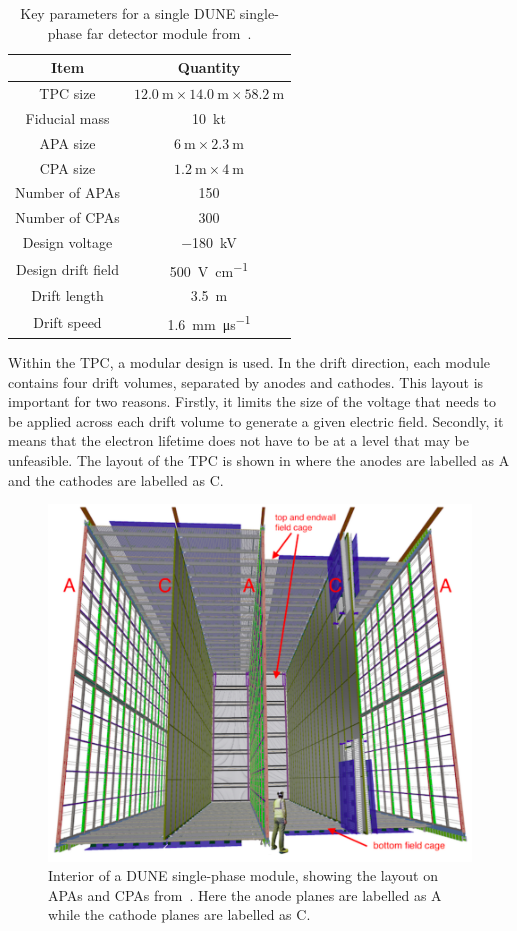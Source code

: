 \begin{table}
  \caption[Key parameters for a single DUNE single-phase far detector module.]{Key parameters for a single DUNE single-phase far detector module from~\cite{tdrVol4}.}
  \label{tab:spStats}
  \centering
  \begin{tabular}{c c}
    \hline
    \hline
    Item & Quantity \\
    \hline
    TPC size & $\SI{12.0}{\metre} \times \SI{14.0}{\metre} \times \SI{58.2}{\metre}$ \\
    Fiducial mass & \SI{10}{\kilo\tonne} \\
    APA size & $\SI{6}{\metre} \times \SI{2.3}{\metre}$ \\
    CPA size & $\SI{1.2}{\metre} \times \SI{4}{\metre}$ \\
    Number of APAs & 150 \\
    Number of CPAs & 300 \\
    Design voltage & \SI{-180}{\kilo\volt} \\
    Design drift field & \SI{500}{\volt\per\centi\metre} \\
    Drift length & \SI{3.5}{\metre} \\
    Drift speed & \SI{1.6}{\milli\metre\per\micro\second} \\
    \hline
  \end{tabular}
\end{table}

Within the TPC, a modular design is used.
In the drift direction, each module contains four drift volumes, separated by anodes and cathodes.
This layout is important for two reasons.
Firstly, it limits the size of the voltage that needs to be applied across each drift volume to generate a given electric field.
Secondly, it means that the electron lifetime does not have to be at a level that may be unfeasible.
The layout of the TPC is shown in  where the anodes are labelled as A and the cathodes are labelled as C. 

\begin{figure}[h]
  \centering
  \includegraphics[width=.6\linewidth]{files/figures/dune_detector/tpcInterior}
  \caption[Interior of a DUNE single-phase module, showing the layout of APAs and CPAs.]{Interior of a DUNE single-phase module, showing the layout on APAs and CPAs from~\cite{tdrVol4}. Here the anode planes are labelled as A while the cathode planes are labelled as C.}
  \label{fig:tpcInterior}
\end{figure}

